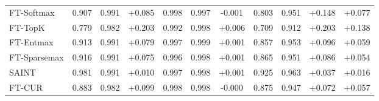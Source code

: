 \begin{table}[ht]
\begin{tabular}{lcccccccccc}
    FT-Softmax & 0.907 & 0.991 & +0.085 & 0.998 & 0.997 & -0.001 & 0.803 & 0.951 & +0.148 & +0.077 \\
    FT-TopK & 0.779 & 0.982 & +0.203 & 0.992 & 0.998 & +0.006 & 0.709 & 0.912 & +0.203 & +0.138 \\
    FT-Entmax & 0.913 & 0.991 & +0.079 & 0.997 & 0.999 & +0.001 & 0.857 & 0.953 & +0.096 & +0.059 \\
    FT-Sparsemax & 0.916 & 0.991 & +0.075 & 0.996 & 0.998 & +0.001 & 0.865 & 0.951 & +0.086 & +0.054 \\
    SAINT & 0.981 & 0.991 & +0.010 & 0.997 & 0.998 & +0.001 & 0.925 & 0.963 & +0.037 & +0.016 \\
    FT-CUR & 0.883 & 0.982 & +0.099 & 0.998 & 0.998 & -0.000 & 0.875 & 0.947 & +0.072 & +0.057 \\
    \bottomrule
  \end{tabular}
\end{table}
